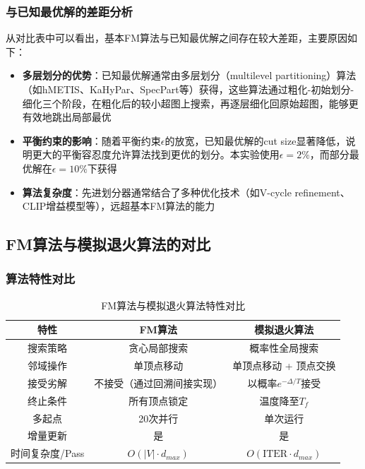 \documentclass{SYSUReport}
\begin{document}
\subsubsection{与已知最优解的差距分析}
从对比表中可以看出，基本FM算法与已知最优解之间存在较大差距，主要原因如下：
\begin{itemize}
\item \textbf{多层划分的优势}：已知最优解通常由多层划分（multilevel partitioning）算法（如hMETIS、KaHyPar、SpecPart等）获得，这些算法通过粗化-初始划分-细化三个阶段，在粗化后的较小超图上搜索，再逐层细化回原始超图，能够更有效地跳出局部最优
\item \textbf{平衡约束的影响}：随着平衡约束$\epsilon$的放宽，已知最优解的cut size显著降低，说明更大的平衡容忍度允许算法找到更优的划分。本实验使用$\epsilon = 2\%$，而部分最优解在$\epsilon = 10\%$下获得
\item \textbf{算法复杂度}：先进划分器通常结合了多种优化技术（如V-cycle refinement、CLIP增益模型等），远超基本FM算法的能力
\end{itemize}

\subsection{FM算法与模拟退火算法的对比}
\subsubsection{算法特性对比}

\begin{table}[H]
\centering
\caption{FM算法与模拟退火算法特性对比}
\begin{tabular}{|c|c|c|}
\hline
特性 & FM算法 & 模拟退火算法 \\
\hline
搜索策略 & 贪心局部搜索 & 概率性全局搜索 \\
\hline
邻域操作 & 单顶点移动 & 单顶点移动 + 顶点交换 \\
\hline
接受劣解 & 不接受（通过回溯间接实现） & 以概率$e^{-\Delta/T}$接受 \\
\hline
终止条件 & 所有顶点锁定 & 温度降至$T_f$ \\
\hline
多起点 & 20次并行 & 单次运行 \\
\hline
增量更新 & 是 & 是 \\
\hline
时间复杂度/Pass & $O(|V| \cdot d_{max})$ & $O(\text{ITER} \cdot d_{max})$ \\
\hline
\end{tabular}
\end{table}
\end{document}
